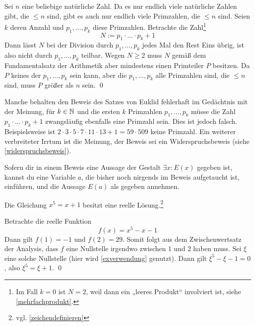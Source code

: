 \begin{bew}
    Sei $n$ eine beliebige natürliche Zahl. Da es nur endlich viele natürliche Zahlen gibt, die $\le n$ sind, gibt es auch nur endlich viele Primzahlen, die $\le n$ sind. Seien $k$ deren Anzahl und $p_1,\dots , p_k$ diese Primzahlen. Betrachte die Zahl\footnote{Im Fall $k=0$ ist $N=2$, weil dann ein „leeres Produkt“ involviert ist, siehe \cref{mehrfachprodukt}.}
        \[ N := p_1\cdot\ldots\cdot p_k + 1 \]
    Dann lässt $N$ bei der Division durch $p_1,\dots , p_k$ jedes Mal den Rest Eins übrig, ist also nicht durch $p_1,\dots , p_k$ teilbar. Wegen $N\ge 2$ muss $N$ gemäß dem Fundamentalsatz der Arithmetik aber mindestens einen Primteiler $P$ besitzen. Da $P$ keines der $p_1,\dots ,p_k$ sein kann, aber die $p_1,\dots , p_k$ alle Primzahlen sind, die $\le n$ sind, muss $P$ größer als $n$ sein. \qed
\end{bew}


\begin{bem}
    Manche behalten den Beweis des Satzes von Euklid fehlerhaft im Gedächtnis mit der Meinung, für $k\in \mathbb N$ und die ersten $k$ Primzahlen $p_1,\dots , p_k$ müsse die Zahl $p_1\cdot\ldots\cdot p_k + 1$ zwangsläufig ebenfalls eine Primzahl sein. Dies ist jedoch falsch. Beispielsweise ist $2\cdot 3\cdot 5\cdot 7\cdot 11\cdot 13+1=59\cdot 509$ keine Primzahl. Ein weiterer verbreiteter Irrtum ist die Meinung, der Beweis sei ein Widerspruchsbeweis (siehe \cref{widerspruchsbeweis}).
\end{bem}


\begin{axiom} \label{exverwendung}
    Sofern dir in einem Beweis eine Aussage der Gestalt $\exists x: E(x)$ gegeben ist, kannst du eine Variable $a$, die bisher noch nirgends im Beweis aufgetaucht ist, einführen, und die Aussage $E(a)$ als gegeben annehmen.
\end{axiom}
  
  
\begin{bsp} \label{bsp:exverwendung}
    Die Gleichung $x^5=x+1$ besitzt eine reelle Lösung.\footnote{vgl. \cref{zeichendefinieren}}
\end{bsp}


\begin{bew}
    Betrachte die reelle Funktion
        \[ f(x) = x^5-x-1 \]
    Dann gilt $f(1)=-1$ und $f(2)=29$. Somit folgt aus dem Zwischenwertsatz der Analysis, dass $f$ eine Nullstelle irgendwo zwischen $1$ und $2$ haben muss. Sei $\xi$ eine solche Nullstelle (hier wird \cref{exverwendung} genutzt). Dann gilt $\xi^5-\xi-1=0$, also $\xi^5=\xi +1$. \qed
\end{bew}


